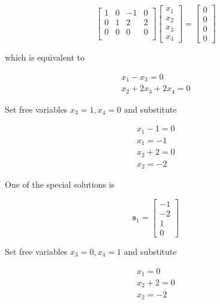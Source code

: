\documentclass[main.tex]{subfiles}
\begin{document}
\begin{enumerate}
\begin{enumerate}
        $$
        \left[\begin{array}{llll}
    	1 & 0 & -1 & 0 \\
    	0 & 1 & 2 & 2 \\
    	0 & 0 & 0 & 0 \\
        \end{array}\right]\left[\begin{array}{l}
        x_1 \\
        x_2 \\
        x_3 \\
        x_4
        \end{array}\right]=\left[\begin{array}{l}
        0 \\
        0 \\
        0 \\
        0
        \end{array}\right]
        $$

        which is equivalent to 

        $$
        \begin{array}{r}
        x_1 - x_3 = 0 \\
        x_2 + 2x_3 + 2x_4 = 0
        \end{array}
        $$

        Set free variables $x_3=1, x_4=0$ and substitute

        $$
        \begin{array}{r}
        x_1 - 1 = 0 \\
        x_1 = -1 \\
        x_2 + 2 = 0 \\
        x_2 = -2
        \end{array}
        $$

        One of the special solutions is
        
        $$\textbf{s}_1=\left[\begin{array}{c}-1 \\ -2 \\ 1 \\ 0\end{array}\right]$$

        Set free variables $x_3=0, x_4=1$ and substitute

        $$
        \begin{array}{r}
        x_1 = 0 \\
        x_2 + 2 = 0 \\
        x_2 = -2 \\
        \end{array}
        $$


\end{enumerate}
\end{enumerate}
\end{document}
